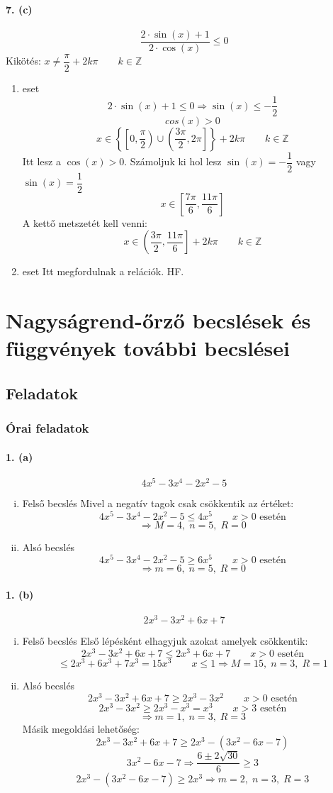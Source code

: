 \documentclass[12pt,a4paper,fleqn]{article}
\newcommand{\myparagraph}[1]{\paragraph{#1}\mbox{}}
\begin{document}
\myparagraph{7. (c)}
\[ \dfrac{2 \cdot \sin(x) + 1}{2 \cdot \cos(x)} \leq 0 \]
Kikötés: $ x \neq \dfrac{\pi}{2} + 2k\pi \qquad k \in \mathbb{Z} $
\begin{enumerate}
  \item eset
  \[ 2 \cdot \sin(x) + 1 \leq 0 \Rightarrow \sin(x) \leq -\dfrac{1}{2}\]
  \[ cos(x) > 0 \]
  \[ x \in \left\{ \left[0, \dfrac{\pi}{2}\right)
    \cup \left(\dfrac{3\pi}{2}, 2\pi\right] \right\} + 2k\pi \qquad k \in \mathbb{Z} \]
  Itt lesz a $\cos(x) > 0$.
  Számoljuk ki hol lesz $\sin(x) = -\dfrac{1}{2}$ vagy $\sin(x) = \dfrac{1}{2}$
  \[ x \in \left[\dfrac{7\pi}{6}, \dfrac{11\pi}{6}\right] \]
  A kettő metszetét kell venni:
  \[ x \in \left(\dfrac{3\pi}{2}, \dfrac{11\pi}{6}\right] + 2k\pi \qquad k \in \mathbb{Z} \]
  \item eset
  Itt megfordulnak a relációk. HF.
\end{enumerate}


\clearpage
\section{Nagyságrend-őrző becslések és\\ függvények további becslései}
\setcounter{subsection}{1}
\subsection{Feladatok}
\subsubsection{Órai feladatok}

\myparagraph{1. (a)}
\[ 4x^5 - 3x^4 - 2x^2 - 5 \]
\begin{enumerate}[i.]
  \item Felső becslés
  Mivel a negatív tagok csak csökkentik az értéket:
  \[ 4x^5 - 3x^4 - 2x^2 - 5 \leq 4x^5 \qquad x > 0 \text{ esetén} \]
  \[ \Rightarrow M = 4,\; n = 5,\; R = 0 \]
  \item Alsó becslés
  \[ 4x^5 - 3x^4 - 2x^2 - 5 \geq 6x^5 \qquad x > 0 \text{ esetén} \]
  \[ \Rightarrow m = 6,\; n = 5,\; R = 0 \]
\end{enumerate}

\myparagraph{1. (b)}
\[ 2x^3 - 3x^2 + 6x + 7 \]
\begin{enumerate}[i.]
  \item Felső becslés
  Első lépésként elhagyjuk azokat amelyek csökkentik:
  \[ 2x^3 - 3x^2 + 6x + 7 \leq 2x^3 + 6x + 7 \qquad x > 0 \text{ esetén} \]
  \[ \leq 2x^3+6x^3+7x^3 = 15x^3 \qquad x \leq 1 \Rightarrow M = 15,\; n = 3,\; R = 1 \]
  \item Alsó becslés
  \[ 2x^3 - 3x^2 + 6x + 7 \geq 2x^3 - 3x^2 \qquad x > 0 \text{ esetén} \]
  \[ 2x^3 - 3x^2 \geq 2x^3 - x^3 = x^3 \qquad x > 3 \text{ esetén} \]
  \[ \Rightarrow m = 1,\; n = 3,\; R = 3 \]
  Másik megoldási lehetőség:
  \[ 2x^3 - 3x^2 + 6x + 7 \geq 2x^3 - (3x^2 - 6x - 7) \]
  \[ 3x^2 - 6x - 7 \Rightarrow \dfrac{6 \pm 2\sqrt{30}}{6} \geq 3\]
  \[ 2x^3 - (3x^2 - 6x - 7) \geq 2x^3 \Rightarrow m = 2,\; n = 3,\; R = 3 \]
\end{enumerate}
\end{document}
